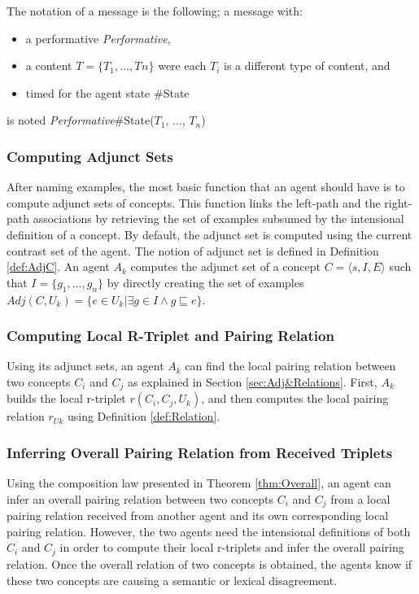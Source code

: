 The notation of a message is the following; a message with:

\begin{itemize}
    \item a performative \emph{Performative},
    \item a content $T = \{ T_{1}, \ldots, T_{}n \}$ were each $T_{i}$ is a different type of content, and
    \item timed for the agent state \#State
\end{itemize}

is noted \emph{Performative}\#State($T_{1}$, $\ldots$, $T_{n}$)

\subsubsection{Computing Adjunct Sets}
\label{sec:funCompAdj}

After naming examples, the most basic function that an agent should have is to compute adjunct sets of concepts. This function links the left-path and the right-path associations by retrieving the set of examples subsumed by the intensional definition of a concept. By default, the adjunct set is computed using the current contrast set of the agent. The notion of adjunct set is defined in Definition \ref{def:AdjC}. An agent $A_{k}$ computes the adjunct set of a concept $C = \langle s, I, E \rangle$ such that $I = \{g_{1}, \ldots, g_{n}\}$ by directly creating the set of examples $Adj(C,U_{k}) = \{ e \in U_{k} | \exists g \in I \wedge g \sqsubseteq e \}$.

\subsubsection{Computing Local R-Triplet and Pairing Relation}
\label{sec:funCompRT}

Using its adjunct sets, an agent $A_{k}$ can find the local pairing relation between two concepts $C_{i}$ and $C_{j}$ as explained in Section \ref{sec:Adj&Relations}. First, $A_{k}$ builds the local r-triplet $r(C_{i}, C_{j}, U_{k})$, and then computes the local pairing relation $r_{Uk}$ using Definition \ref{def:Relation}.

\subsubsection{Inferring Overall Pairing Relation from Received Triplets}
\label{sec:funInferOv}

Using the composition law presented in Theorem \ref{thm:Overall}, an agent can infer an overall pairing relation between two concepts $C_{i}$ and $C_{j}$ from a local pairing relation received from another agent and its own corresponding local pairing relation. However, the two agents need the intensional definitions of both $C_{i}$ and $C_{j}$ in order to compute their local r-triplets and infer the overall pairing relation. Once the overall relation of two concepts is obtained, the agents know if these two concepts are causing a semantic or lexical disagreement. 

